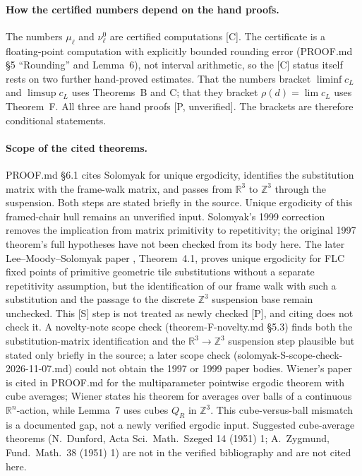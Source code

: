 \documentclass[11pt]{article}
\begin{document}
\paragraph{How the certified numbers depend on the hand proofs.} The numbers $\mu_\ell$ and $\nu^0_\ell$ are certified computations [C]. The certificate is a floating-point computation with explicitly bounded rounding error (PROOF.md \S5 ``Rounding'' and Lemma~6), not interval arithmetic, so the [C] status itself rests on two further hand-proved estimates. That the numbers bracket $\liminf c_L$ and $\limsup c_L$ uses Theorems~B and C; that they bracket $\rho(d)=\lim c_L$ uses Theorem~F. All three are hand proofs [P, unverified]. The brackets are therefore conditional statements.
\paragraph{Scope of the cited theorems.} PROOF.md \S6.1 cites Solomyak \cite{solomyak1997dynamics,solomyak1999corrections} for unique ergodicity, identifies the substitution matrix with the frame-walk matrix, and passes from $\mathbb{R}^3$ to $\mathbb{Z}^3$ through the suspension. Both steps are stated briefly in the source. Unique ergodicity of this framed-chair hull remains an unverified input. Solomyak's 1999 correction removes the implication from matrix primitivity to repetitivity; the original 1997 theorem's full hypotheses have not been checked from its body here. The later Lee--Moody--Solomyak paper \cite{lee2003consequences}, Theorem~4.1, proves unique ergodicity for FLC fixed points of primitive geometric tile substitutions without a separate repetitivity assumption, but the identification of our frame walk with such a substitution and the passage to the discrete $\mathbb{Z}^3$ suspension base remain unchecked. This [S] step is not treated as newly checked [P], and citing \cite{lee2003consequences} does not check it. A novelty-note scope check (theorem-F-novelty.md \S5.3) finds both the substitution-matrix identification and the $\mathbb{R}^3\to\mathbb{Z}^3$ suspension step plausible but stated only briefly in the source; a later scope check (solomyak-S-scope-check-2026-11-07.md) could not obtain the 1997 or 1999 paper bodies. Wiener's paper \cite{wiener1939ergodic} is cited in PROOF.md for the multiparameter pointwise ergodic theorem with cube averages; Wiener states his theorem for averages over balls of a continuous $\mathbb{R}^n$-action, while Lemma~7 uses cubes $Q_R$ in $\mathbb{Z}^3$. This cube-versus-ball mismatch is a documented gap, not a newly verified ergodic input. Suggested cube-average theorems (N.~Dunford, Acta Sci.\ Math.\ Szeged 14 (1951) 1; A.~Zygmund, Fund.\ Math.\ 38 (1951) 1) are not in the verified bibliography and are not cited here.
\end{document}
